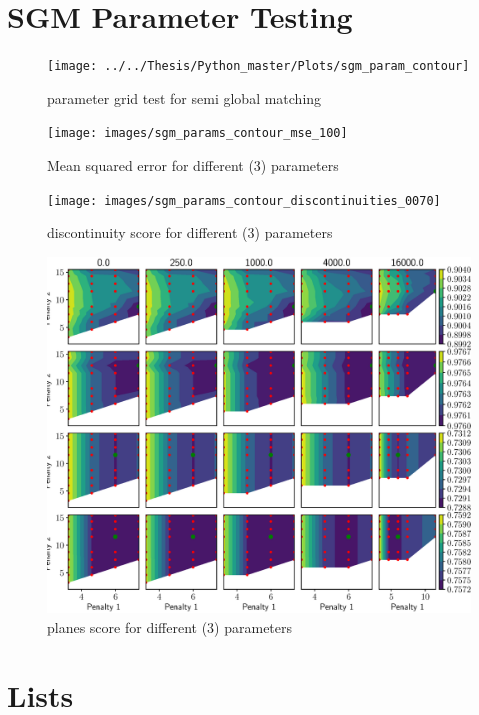 \documentclass  [
  paper    = a4,
  BCOR     = 10mm,
  twoside,
  fontsize = 12pt,
  fleqn,
  toc      = bibnumbered,
  toc      = listofnumbered,
  numbers  = noendperiod,
  headings = normal,
  listof   = leveldown,
  version  = 3.03
]                                       {scrreprt}
\begin{document}
\begin{appendix}
  	
  	 
  	\chapter{SGM Parameter Testing}
  	\begin{figure}
  		\centering
  		\texttt{[image: ../../Thesis/Python\_master/Plots/sgm\_param\_contour]}
  		\caption[parameter grid test for semi global matching]{parameter grid test for semi global matching}
  		\label{fig:sgmparamcontour}
  	\end{figure}
  	
  	\begin{figure}
  		\centering
  		\texttt{[image: images/sgm\_params\_contour\_mse\_100]}
  		\caption[Mean squared error for different (3) parameters]{Mean squared error for different (3) parameters}
  		\label{fig:sgmparamscontourmse100}
  	\end{figure}
  	
  	\begin{figure}
  		\centering
  		\texttt{[image: images/sgm\_params\_contour\_discontinuities\_0070]}
  		\caption[Discontinuity score for different (3) parameters]{discontinuity score for different (3) parameters}
  		\label{fig:sgmparamscontourdis}
  	\end{figure}
  	
  	\begin{figure}
  		\centering
  		\includegraphics[width=1\linewidth]{images/sgm_params_contour_mae_planes}
  		\caption[planes score for different (3) parameters]{planes score for different (3) parameters}
  		\label{fig:sgmparamscontourdmae}
  	\end{figure}
    \chapter{Lists}
    \listoffigures
    \listoftables
    {}
    
    
  \end{appendix}
\end{document}
